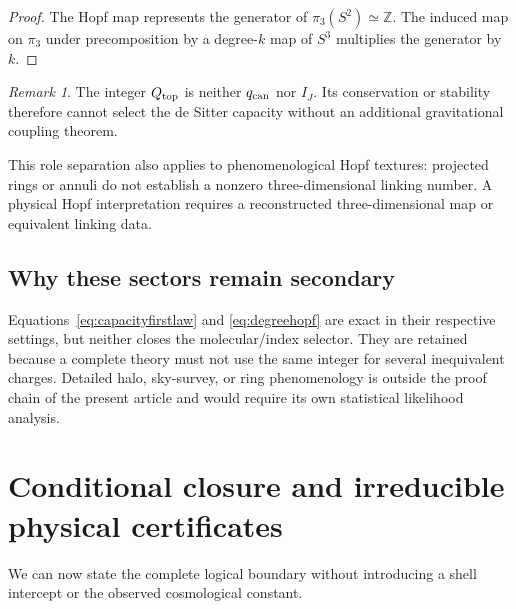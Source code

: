 \documentclass[aps,prd,preprint,nofootinbib,superscriptaddress]{revtex4-2}
\theoremstyle{definition}
\theoremstyle{remark}
\newtheorem{remark}[theorem]{Remark}
\begin{document}
\begin{proof}
The Hopf map represents the generator of $\pi_3(S^2)\simeq\mathbb Z$.  The
induced map on $\pi_3$ under precomposition by a degree-$k$ map of $S^3$
multiplies the generator by $k$.
\end{proof}

\begin{remark}
The integer $Q_{\rm top}$ is neither $q_{\rm can}$ nor $I_J$.  Its conservation
or stability therefore cannot select the de Sitter capacity without an
additional gravitational coupling theorem.
\end{remark}

This role separation also applies to phenomenological Hopf textures: projected
rings or annuli do not establish a nonzero three-dimensional linking number.
A physical Hopf interpretation requires a reconstructed three-dimensional map
or equivalent linking data.

\subsection{Why these sectors remain secondary}

Equations~\eqref{eq:capacityfirstlaw} and \eqref{eq:degreehopf} are exact in
their respective settings, but neither closes the molecular/index selector.
They are retained because a complete theory must not use the same integer for
several inequivalent charges.  Detailed halo, sky-survey, or ring
phenomenology is outside the proof chain of the present article and would
require its own statistical likelihood analysis.

\section{Conditional closure and irreducible physical certificates}
\label{sec:closure}

We can now state the complete logical boundary without introducing a shell
intercept or the observed cosmological constant.
\end{document}

